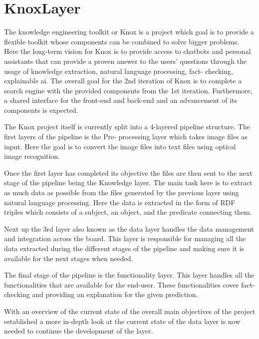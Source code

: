 \section{KnoxLayer}
The knowledge engineering toolkit or Knox is a project which goal is to provide a flexible toolkit whose components can be combined 
to solve bigger problems. Here the long-term vision for Knox is to provide access to chatbots and personal assistants that can  
provide a proven answer to the users' questions through the usage of knowledge extraction, natural language processing, fact- 
checking, explainable ai. 
The overall goal for the 2nd iteration of Knox is to complete a search engine with the provided components from the 1st iteration. 
Furthermore, a shared interface for the front-end and back-end and an advancement of its components is expected. 


The Knox project itself is currently split into a 4-layered pipeline structure. The first layers of the pipeline is the Pre-
processing layer which takes image files as input. Here the goal is to convert the image files into text files using optical image 
recognition. 


Once the first layer has completed its objective the files are then sent to the next stage of the pipeline being the Knowledge 
layer. The main task here is to extract as much data as possible from the files generated by the previous layer using natural 
language processing. Here the data is extracted in the form of RDF triples which consists of a subject, an object, and the predicate 
connecting them. 


Next up the 3rd layer also known as the data layer handles the data management and integration across the board. This layer is 
responsible for managing all the data extracted during the different stages of the pipeline and making sure it is available for the 
next stages when needed. 


The final stage of the pipeline is the functionality layer. This layer handles all the functionalities that are available for the 
end-user. These functionalities cover fact-checking and providing an explanation for the given prediction.


With an overview of the current state of the overall main objectives of the project  established a more in-depth look at the current 
state of the data layer is now needed to continue the development of the layer. 

